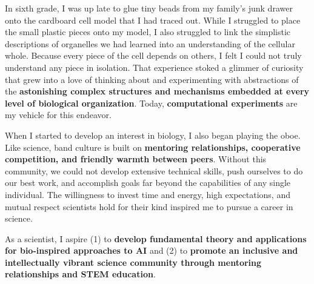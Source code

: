 In sixth grade, I was up late to glue tiny beads from my family's junk drawer onto the cardboard cell model that I had traced out.
While I struggled to place the small plastic pieces onto my model, I also struggled to link the simplistic descriptions of organelles we had learned into an understanding of the cellular whole.
Because every piece of the cell depends on others, I felt I could not truly understand any piece in isolation.
That experience stoked a glimmer of curiosity that grew into a love of thinking about and experimenting with abstractions of the \textbf{astonishing complex structures and mechanisms embedded at every level of biological organization}.
Today, \textbf{computational experiments} are my vehicle for this endeavor.

When I started to develop an interest in biology, I also began playing the oboe.
Like science, band culture is built on \textbf{mentoring relationships, cooperative competition, and friendly warmth between peers}.
Without this community, we could not develop extensive technical skills, push ourselves to do our best work, and accomplish goals far beyond the capabilities of any single individual.
The willingness to invest time and energy, high expectations, and mutual respect scientists hold for their kind inspired me to pursue a career in science.

As a scientist, I aspire
(1) to \textbf{develop fundamental theory and applications for bio-inspired approaches to AI} and
(2) to \textbf{promote an inclusive and intellectually vibrant science community through mentoring relationships and STEM education}.
